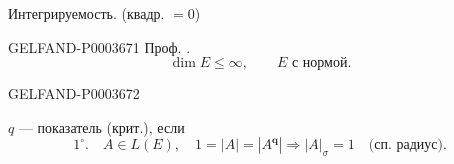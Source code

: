 Интегрируемость. (квадр. $=0$)


\begin{GelfandAdjacentEvidence}{GELFAND-P000367}{1}
Проф. .
\begin{equation*}\dim E\le\infty,\qquad E\text{ с нормой}.\end{equation*}
\end{GelfandAdjacentEvidence}
\begin{GelfandAdjacentEvidence}{GELFAND-P000367}{2}

$q$ --- показатель (крит.), если
\begin{equation*}1^\circ.\quad A\in L(E),\quad1=|A|=|A^{\boldsymbol{q}}|\Rightarrow|A|_\sigma=1\quad\text{(сп. радиус)}.\end{equation*}
\end{GelfandAdjacentEvidence}
